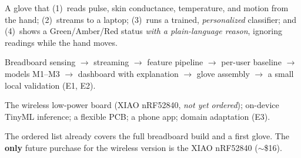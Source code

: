 \documentclass[11pt]{article}
\begin{document}
\noindent
\begin{minipage}[t]{0.485\linewidth}
\begin{tcolorbox}[title={Goal (by Day 10)}, colframe=nsblue, colbacktitle=nsblue,
  colback=nsblue!5, coltitle=white, fonttitle=\sffamily\bfseries, arc=3pt, boxrule=1pt]
A glove that (1)~reads pulse, skin conductance, temperature, and motion from the hand;
(2)~streams to a laptop; (3)~runs a trained, \emph{personalized} classifier; and (4)~shows a
Green/Amber/Red status \emph{with a plain-language reason}, ignoring readings while the hand moves.
\end{tcolorbox}
\end{minipage}\hfill
\begin{minipage}[t]{0.485\linewidth}
\begin{tcolorbox}[title={In scope}, colframe=nsgreen, colbacktitle=nsgreen,
  colback=nsgreen!5, coltitle=white, fonttitle=\sffamily\bfseries, arc=3pt, boxrule=1pt]
Breadboard sensing $\rightarrow$ streaming $\rightarrow$ feature pipeline $\rightarrow$ per-user
baseline $\rightarrow$ models M1--M3 $\rightarrow$ dashboard with explanation $\rightarrow$ glove
assembly $\rightarrow$ a small local validation (E1, E2).
\end{tcolorbox}
\end{minipage}

\vspace{8pt}
\noindent
\begin{minipage}[t]{0.485\linewidth}
\begin{tcolorbox}[title={Out of scope (later cycle)}, colframe=nsgrey, colbacktitle=nsgrey,
  colback=nsgrey!5, coltitle=white, fonttitle=\sffamily\bfseries, arc=3pt, boxrule=1pt]
The wireless low-power board (XIAO nRF52840, \emph{not yet ordered}); on-device TinyML inference;
a flexible PCB; a phone app; domain adaptation (E3).
\end{tcolorbox}
\end{minipage}\hfill
\begin{minipage}[t]{0.485\linewidth}
\begin{tcolorbox}[title={Parts status}, colframe=amber, colbacktitle=amber,
  colback=amber!8, coltitle=white, fonttitle=\sffamily\bfseries, arc=3pt, boxrule=1pt]
The ordered list already covers the full breadboard build and a first glove. The \textbf{only} future
purchase for the wireless version is the XIAO nRF52840 ($\sim$\$16).
\end{tcolorbox}
\end{minipage}
\end{document}
